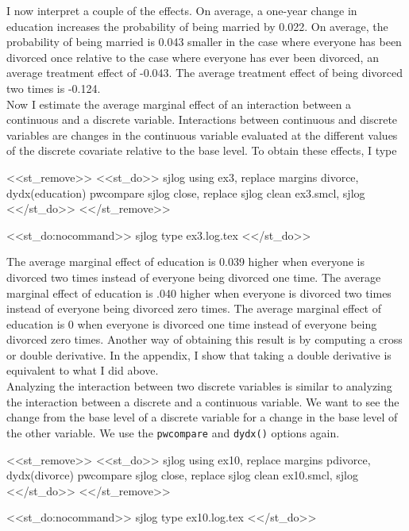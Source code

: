 \documentclass[11pt]{article}
\begin{document}
I now interpret a couple of the effects. On average, a one-year change in education increases the probability of being married by 0.022. On average, the probability of being married is 0.043 smaller in the case where everyone has been divorced once relative to the case where everyone has ever been divorced, an average treatment effect of -0.043. The average treatment effect of being divorced two times is -0.124. \\ 

Now I estimate the average marginal effect of an interaction between a continuous and a discrete variable. Interactions between continuous and discrete variables are changes in the continuous variable evaluated at the different values of the discrete covariate relative to the base level.  To obtain these effects, I type

<<st_remove>>
<<st_do>>
sjlog using ex3, replace 
margins divorce, dydx(education) pwcompare
sjlog close, replace 
sjlog clean ex3.smcl, sjlog 
<</st_do>>
<</st_remove>>

\begin{stlog}[auto]
<<st_do:nocommand>>
sjlog type ex3.log.tex
<</st_do>>
\end{stlog}

The average marginal effect of education is 0.039 higher when everyone is divorced two times instead of everyone being divorced one time. The average marginal effect of education is .040 higher when everyone is divorced two times instead of everyone being divorced zero times. The average marginal effect of education is 0 when everyone is divorced one time instead of everyone being divorced zero times. Another way of obtaining this result is by computing a cross or double derivative. In the appendix, I show that taking a double derivative is equivalent to what I did above.\\  

Analyzing the interaction between two discrete variables is similar to analyzing the interaction between a discrete and a continuous variable. We want to see the change from the base level of a discrete variable for a change in the base level of the other variable. We use the \texttt{pwcompare} and \texttt{dydx()} options again.

<<st_remove>>
<<st_do>>
sjlog using ex10, replace 
margins pdivorce, dydx(divorce) pwcompare
sjlog close, replace 
sjlog clean ex10.smcl, sjlog 
<</st_do>>
<</st_remove>>

\begin{stlog}[auto]
<<st_do:nocommand>>
sjlog type ex10.log.tex
<</st_do>>
\end{stlog}
\end{document}
